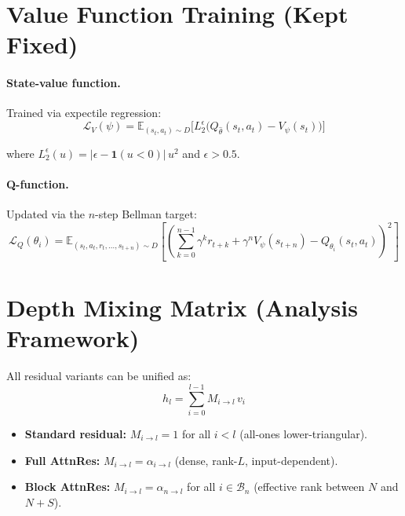 \documentclass[11pt]{article}
\begin{document}
\section{Value Function Training (Kept Fixed)}

\paragraph{State-value function.}
Trained via expectile regression:
\begin{equation}
    \mathcal{L}_V(\psi)
    = \mathbb{E}_{(s_t, a_t) \sim D}\!
    \Big[
        L_2^{\epsilon}\!\Big(Q_{\hat{\theta}}(s_t, a_t) - V_\psi(s_t)\Big)
    \Big]
\end{equation}

where $L_2^{\epsilon}(u) = |\epsilon - \mathbf{1}(u < 0)|\, u^2$ and $\epsilon > 0.5$.

\paragraph{Q-function.}
Updated via the $n$-step Bellman target:
\begin{equation}
    \mathcal{L}_Q(\theta_i)
    = \mathbb{E}_{(s_t, a_t, r_t, \ldots, s_{t+n}) \sim D}\!
    \left[
        \left(
            \sum_{k=0}^{n-1} \gamma^k r_{t+k}
            + \gamma^n V_\psi(s_{t+n})
            - Q_{\theta_i}(s_t, a_t)
        \right)^{\!2}
    \right]
\end{equation}


\section{Depth Mixing Matrix (Analysis Framework)}

All residual variants can be unified as:
\begin{equation}
    h_l = \sum_{i=0}^{l-1} M_{i \to l}\, v_i
\end{equation}

\begin{itemize}[nosep]
    \item \textbf{Standard residual:} $M_{i \to l} = 1$ for all $i < l$ (all-ones lower-triangular).
    \item \textbf{Full AttnRes:} $M_{i \to l} = \alpha_{i \to l}$ (dense, rank-$L$, input-dependent).
    \item \textbf{Block AttnRes:} $M_{i \to l} = \alpha_{n \to l}$ for all $i \in \mathcal{B}_n$ (effective rank between $N$ and $N+S$).
\end{itemize}
\end{document}
